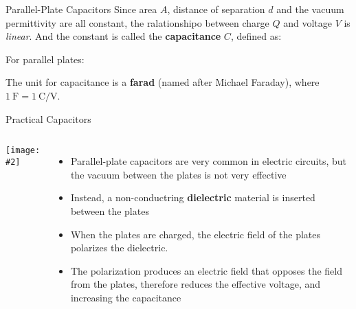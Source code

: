 \documentclass[12pt,aspectratio=169]{beamer}
\newcommand{\pic}[2]{\texttt{[image: \#2]}}
\newcommand{\eq}[2]{\vspace{#1}{\Large\begin{displaymath}#2\end{displaymath}}}
\begin{document}
\begin{frame}{Parallel-Plate Capacitors}
  Since area $A$, distance of separation $d$ and the vacuum permittivity are
  all constant, the ralationshipo between charge $Q$ and voltage $V$ is
  \emph{linear}. And the constant is called the \textbf{capacitance} $C$,
  defined as:

  \eq{-.15in}{
    \boxed{C=\frac{Q}{V}}
  }

  For parallel plates:

  \eq{-.2in}{
    C=\frac{A\epsilon_0}{d}
  }

  The unit for capacitance is a \textbf{farad} (named after Michael Faraday),
  where $\SI{1}{\farad}=\SI{1}{\coulomb\per\volt}$.
\end{frame}


%  
%  



\begin{frame}{Practical Capacitors}
  \begin{columns}
    \pic{1.2}{Figure_20_05_05a.png}
    \begin{itemize}
    \item Parallel-plate capacitors are very common in electric circuits,
      but the vacuum between the plates is not very effective
    \item Instead, a non-conductring \textbf{dielectric} material is inserted
      between the plates
    \item When the plates are charged, the electric field of the plates
      polarizes the dielectric.
    \item The polarization  produces an electric field that opposes the field
      from the plates, therefore reduces the effective voltage, and increasing
      the capacitance
    \end{itemize}
  \end{columns}
\end{frame}
\end{document}
